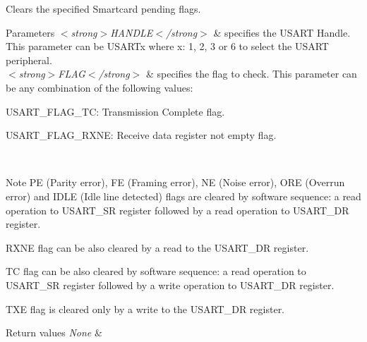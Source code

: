 Clears the specified Smartcard pending flags. 


\begin{DoxyParams}{Parameters}
{\em $<$strong$>$\+H\+A\+N\+D\+L\+E$<$/strong$>$} & specifies the U\+S\+A\+RT Handle. This parameter can be U\+S\+A\+R\+Tx where x\+: 1, 2, 3 or 6 to select the U\+S\+A\+RT peripheral. \\
\hline
{\em $<$strong$>$\+F\+L\+A\+G$<$/strong$>$} & specifies the flag to check. This parameter can be any combination of the following values\+: \begin{DoxyItemize}
\item U\+S\+A\+R\+T\+\_\+\+F\+L\+A\+G\+\_\+\+TC\+: Transmission Complete flag. \item U\+S\+A\+R\+T\+\_\+\+F\+L\+A\+G\+\_\+\+R\+X\+NE\+: Receive data register not empty flag.\end{DoxyItemize}
\\
\hline
\end{DoxyParams}
\begin{DoxyNote}{Note}
PE (Parity error), FE (Framing error), NE (Noise error), O\+RE (Overrun error) and I\+D\+LE (Idle line detected) flags are cleared by software sequence\+: a read operation to U\+S\+A\+R\+T\+\_\+\+SR register followed by a read operation to U\+S\+A\+R\+T\+\_\+\+DR register. 

R\+X\+NE flag can be also cleared by a read to the U\+S\+A\+R\+T\+\_\+\+DR register. 

TC flag can be also cleared by software sequence\+: a read operation to U\+S\+A\+R\+T\+\_\+\+SR register followed by a write operation to U\+S\+A\+R\+T\+\_\+\+DR register. 

T\+XE flag is cleared only by a write to the U\+S\+A\+R\+T\+\_\+\+DR register.
\end{DoxyNote}

\begin{DoxyRetVals}{Return values}
{\em None} & \\
\hline
\end{DoxyRetVals}
